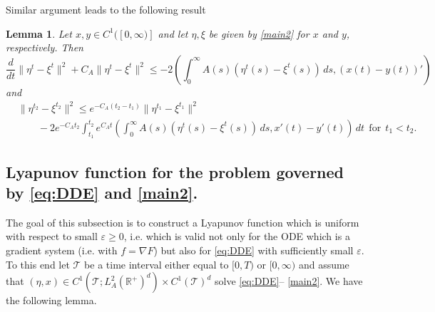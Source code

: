 \documentclass[11pt, leqno]{amsart}
\newtheorem{lem}[thm]{Lemma}
\theoremstyle{definition}
\def\R{\mathbb{R}}
\begin{document}
Similar argument leads to the following result
\begin{lem}\label{lem:diff_ogon}
	Let $x,y\in C^1([0,\infty)]$ and let $\eta,\xi$ be given by \eqref{main2} for $x$ and $y$, respectively.  Then
	\begin{equation}\label{eq:3}
		\frac{d}{d t}\|\eta^t-\xi^t\|^2  + C_A\|\eta^t-\xi^t\|^2 \leq  - 2\left(\int_0^\infty A(s)(\eta^t(s)-\xi^t(s))\, ds,(x(t)-y(t))'\right)
	\end{equation}
	and
	\begin{align*}
		& \|\eta^{t_2}-\xi^{t_2}\|^2 \leq e^{-C_A(t_2-t_1)}\|\eta^{t_1}-\xi^{t_1}\|^2 \\
		& \qquad - 2 e^{-C_At_2} \int_{t_1}^{t_2}e^{C_At}\left(\int_0^\infty A(s)(\eta^t(s)-\xi^t(s))\, ds,x'(t)-y'(t)\right) \, dt\ \ \textrm{for} \ \ t_1< t_2.
	\end{align*}
\end{lem}






\subsection{Lyapunov function for the problem governed by \eqref{eq:DDE} and \eqref{main2}.}

The goal of this subsection is to construct a Lyapunov function which is uniform with respect to small $\varepsilon \geq 0$, i.e. which is valid not only for the ODE which is a gradient system (i.e. with $f=\nabla F$) but also  for \eqref{eq:DDE} with sufficiently small $\varepsilon$. To this end let $\mathcal{T}$ be a time interval either equal to $[0,T)$ or $[0,\infty)$ and assume that  $(\eta,x)\in  C^1(\mathcal{T};L^2_A(\R^+)^d)\times C^1(\mathcal{T})^d $ solve \eqref{eq:DDE}-- \eqref{main2}. We have the following lemma.
\end{document}
